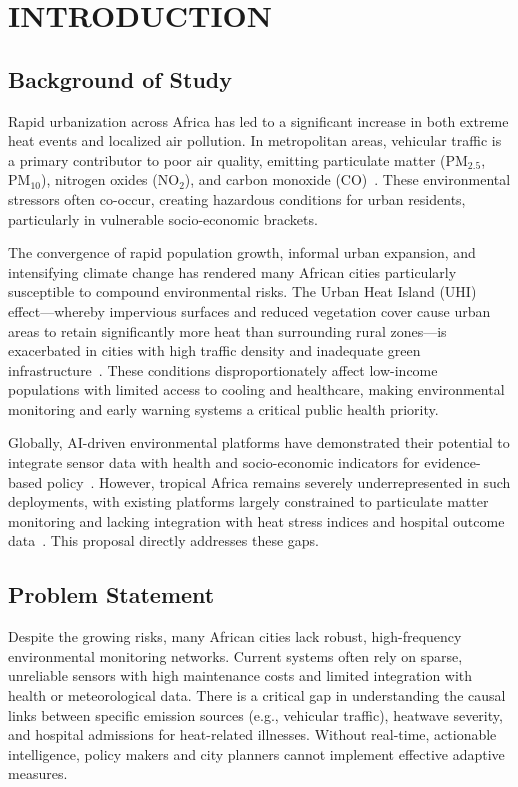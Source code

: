 \documentclass[12pt,a4paper]{report}
\begin{document}
\setcounter{page}{1}

\chapter{INTRODUCTION}

\section{Background of Study}
Rapid urbanization across Africa has led to a significant increase in both extreme heat events and localized air pollution. In metropolitan areas, vehicular traffic is a primary contributor to poor air quality, emitting particulate matter (PM$_{2.5}$, PM$_{10}$), nitrogen oxides (NO$_2$), and carbon monoxide (CO)~\cite{bhaskar2025}. These environmental stressors often co-occur, creating hazardous conditions for urban residents, particularly in vulnerable socio-economic brackets.

The convergence of rapid population growth, informal urban expansion, and intensifying climate change has rendered many African cities particularly susceptible to compound environmental risks. The Urban Heat Island (UHI) effect—whereby impervious surfaces and reduced vegetation cover cause urban areas to retain significantly more heat than surrounding rural zones—is exacerbated in cities with high traffic density and inadequate green infrastructure~\cite{assaf2023,gaur2026}. These conditions disproportionately affect low-income populations with limited access to cooling and healthcare, making environmental monitoring and early warning systems a critical public health priority.

Globally, AI-driven environmental platforms have demonstrated their potential to integrate sensor data with health and socio-economic indicators for evidence-based policy~\cite{mehryar2024,eze2025}. However, tropical Africa remains severely underrepresented in such deployments, with existing platforms largely constrained to particulate matter monitoring and lacking integration with heat stress indices and hospital outcome data~\cite{bainomugisha2024,gaur2026}. This proposal directly addresses these gaps.

\section{Problem Statement}
Despite the growing risks, many African cities lack robust, high-frequency environmental monitoring networks. Current systems often rely on sparse, unreliable sensors with high maintenance costs and limited integration with health or meteorological data. There is a critical gap in understanding the causal links between specific emission sources (e.g., vehicular traffic), heatwave severity, and hospital admissions for heat-related illnesses. Without real-time, actionable intelligence, policy makers and city planners cannot implement effective adaptive measures.
\end{document}
